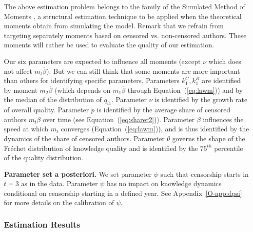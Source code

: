 The above estimation problem belongs to the family of the Simulated Method of Moments \cite{mcfadden1989method}, a structural estimation technique to be applied when the theoretical moments obtain from simulating the model. Remark that we refrain from targeting separately moments based on censored vs. non-censored authors. These moments will rather be used to evaluate the quality of our estimation.

Our six parameters are expected to influence all moments (except $\nu$ which does not affect $m_t\overline{\beta}$). But we can still think that some moments are more important than others for identifying specific parameters. Parameters $k^C_1,k^R_1$ are  identified by moment $m_2 \overline{\beta}$ (which depends on $m_1 \overline{\beta}$ through Equation~(\ref{eq:lawm}))  and by the median of the distribution of $q_{i1}$. Parameter $\nu$ is identified by the growth rate of overall quality. Parameter $p$ is  identified by the average share of censored authors $m_t \overline{\beta}$ over time (see Equation~(\ref{eq:sharer2})).  Parameter $\overline{\beta}$ influences the speed at which $m_t$ converges (Equation~(\ref{eq:lawm})), and is thus identified by the dynamics of the share of censored authors. Parameter $\theta$ governs the shape of the Fr\'echet distribution of knowledge quality and is identified by the $75^{th}$ percentile of the quality distribution.




\textbf{Parameter set a posteriori.}  We set parameter $\psi$ such that censorship starts in $t=3$ as in the data. Parameter $\psi$ has no impact on knowledge dynamics conditional on censorship starting in a defined year. See Appendix~\ref{O-app:dpsi} for more details on the calibration of $\psi$.





\subsubsection*{Estimation Results}

